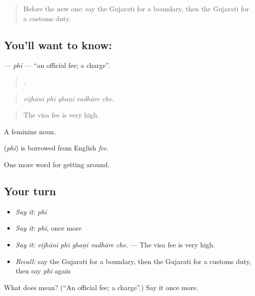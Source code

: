 \label{lesson:GU-C406-phi}



\begin{quote}
Before the new one: say the Gujarati for a boundary, then the Gujarati for a customs duty.
\end{quote}

\subsection*{You'll want to know: }
\textbf{} — \emph{phī} — \textquotedblleft{}an official fee; a charge\textquotedblright{}.

\begin{quote}
    .
\end{quote}

\begin{quote}
\emph{vijhānī phī ghaṇī vadhāre che.}
\end{quote}

\begin{quote}
The visa fee is very high.
\end{quote}

A feminine noun.

\begin{cousinweb}
\textbf{} (\emph{phī}) is borrowed from English \emph{fee}.
\end{cousinweb}

\begin{grammarlens}[title={What you've built}]
One more word for getting around.
\end{grammarlens}

\subsection*{Your turn}
\begin{itemize}
\raggedright
  \item \emph{Say it:} \emph{phī}
  \item \emph{Say it:} \emph{phī}, once more
  \item \emph{Say it:} \emph{vijhānī phī ghaṇī vadhāre che.} — The visa fee is very high.
  \item \emph{Recall:} say the Gujarati for a boundary, then the Gujarati for a customs duty, then say \emph{phī} again
\end{itemize}

\begin{tcolorbox}[breakable,colback=teal!4,colframe=teal!35!black,title={Before you move on}]
What does  mean? (\textquotedblleft{}An official fee; a charge\textquotedblright{}.) Say it once more.
\end{tcolorbox}

